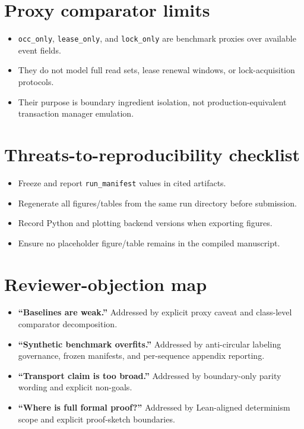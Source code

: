 \documentclass[11pt]{article}
\begin{document}
\section{Proxy comparator limits}
\begin{itemize}[leftmargin=1.5em]
\item \texttt{occ\_only}, \texttt{lease\_only}, and \texttt{lock\_only} are benchmark proxies over available event fields.
\item They do not model full read sets, lease renewal windows, or lock-acquisition protocols.
\item Their purpose is boundary ingredient isolation, not production-equivalent transaction manager emulation.
\end{itemize}

\section{Threats-to-reproducibility checklist}
\begin{itemize}[leftmargin=1.5em]
\item Freeze and report \texttt{run\_manifest} values in cited artifacts.
\item Regenerate all figures/tables from the same run directory before submission.
\item Record Python and plotting backend versions when exporting figures.
\item Ensure no placeholder figure/table remains in the compiled manuscript.
\end{itemize}

\section{Reviewer-objection map}
\begin{itemize}[leftmargin=1.5em]
\item \textbf{``Baselines are weak.''} Addressed by explicit proxy caveat and class-level comparator decomposition.
\item \textbf{``Synthetic benchmark overfits.''} Addressed by anti-circular labeling governance, frozen manifests, and per-sequence appendix reporting.
\item \textbf{``Transport claim is too broad.''} Addressed by boundary-only parity wording and explicit non-goals.
\item \textbf{``Where is full formal proof?''} Addressed by Lean-aligned determinism scope and explicit proof-sketch boundaries.
\end{itemize}
\end{document}
